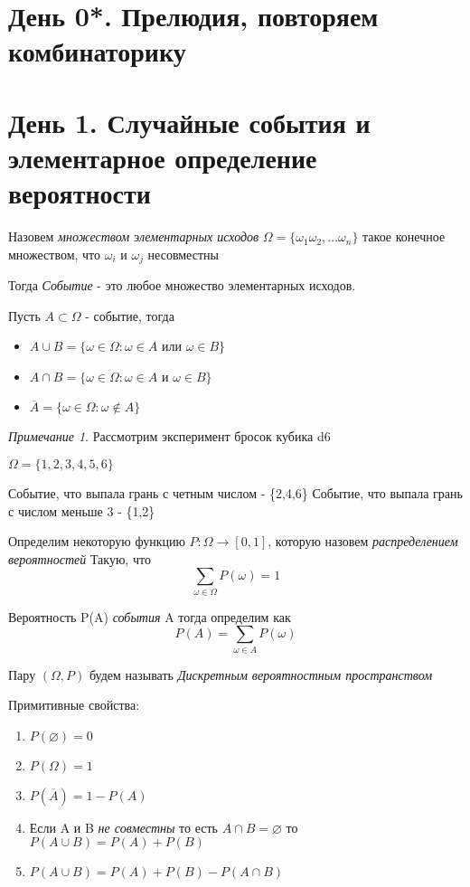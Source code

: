 \documentclass{article}
\theoremstyle{definition}
\theoremstyle{remark}
\newtheorem*{remark}{Примечание}
\begin{document}
\tableofcontents


\section{День 0*. Прелюдия, повторяем комбинаторику}

\section{День 1. Случайные события и элементарное определение вероятности}

Назовем \textit{множеством элементарных исходов} $\varOmega = \{\omega_1\omega_2,...\omega_n \}$ такое конечное множеством, 
что $\omega_i$ и $\omega_j$ несовместны

Тогда \textit{Событие} - это любое множество элементарных исходов. 

Пусть $A \subset \varOmega$ - событие, тогда
\begin{itemize}
    \item $ A \cup B = \{\omega \in \varOmega : \omega \in A$ или $ \omega \in B\} $ 
    \item  $ A \cap B = \{\omega \in \varOmega : \omega \in A$ и $ \omega \in B\} $ 
    \item $ \overline{A} = \{ \omega \in \varOmega : \omega \notin A \} $
\end{itemize}

\begin{remark}

Рассмотрим эксперимент бросок кубика d6 

$\varOmega = \{1,2,3,4,5,6\}$

Событие, что выпала грань с четным числом - \{2,4,6\}
Событие, что выпала грань с числом меньше 3 - \{1,2\}

\end{remark}

Определим некоторую функцию $P: \varOmega \to [0,1]$, которую назовем 
\textit{распределением вероятностей}
Такую, что 
$$
\sum_{\omega \in \varOmega} P(\omega)  = 1
$$

Вероятность P(A) \textit{события} A тогда определим как 
$$
P(A) = \sum_{\omega \in A} P(\omega)  
$$

Пару $(\varOmega, P)$ будем называть \textit{Дискретным вероятностным пространством}



Примитивные свойства:

\begin{enumerate}
 \item $ P(\varnothing) = 0 $
 \item $ P(\varOmega) = 1 $
 \item $P(\overline{A}) = 1 - P(A)$
 \item Если A и B \textit{не совместны} то есть $A \cap B = \varnothing$ то $ P(A \cup B) = P(A) + P(B) $
 \item $ P(A \cup B) = P(A) + P(B) - P(A \cap B) $
\end{enumerate}
\end{document}
